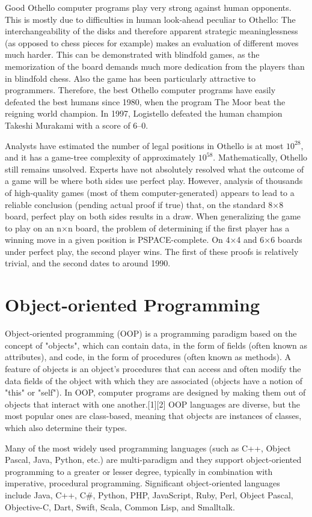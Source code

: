 \documentclass[a4paper]{report}
\begin{document}
Good Othello computer programs play very strong against human opponents. This is mostly due to difficulties in human look-ahead peculiar to Othello: The interchangeability of the disks and therefore apparent strategic meaninglessness (as opposed to chess pieces for example) makes an evaluation of different moves much harder. This can be demonstrated with blindfold games, as the memorization of the board demands much more dedication from the players than in blindfold chess. Also the game has been particularly attractive to programmers. Therefore, the best Othello computer programs have easily defeated the best humans since 1980, when the program The Moor beat the reigning world champion. In 1997, Logistello defeated the human champion Takeshi Murakami with a score of 6–0. 
\par
Analysts have estimated the number of legal positions in Othello is at most $10^28$, and it has a game-tree complexity of approximately $10^58$. Mathematically, Othello still remains unsolved. Experts have not absolutely resolved what the outcome of a game will be where both sides use perfect play. However, analysis of thousands of high-quality games (most of them computer-generated) appears to lead to a reliable conclusion (pending actual proof if true) that, on the standard 8×8 board, perfect play on both sides results in a draw. When generalizing the game to play on an n×n board, the problem of determining if the first player has a winning move in a given position is PSPACE-complete. On 4×4 and 6×6 boards under perfect play, the second player wins. The first of these proofs is relatively trivial, and the second dates to around 1990. 

\section{Object-oriented Programming}
Object-oriented programming (OOP) is a programming paradigm based on the concept of "objects", which can contain data, in the form of fields (often known as attributes), and code, in the form of procedures (often known as methods). A feature of objects is an object's procedures that can access and often modify the data fields of the object with which they are associated (objects have a notion of "this" or "self"). In OOP, computer programs are designed by making them out of objects that interact with one another.[1][2] OOP languages are diverse, but the most popular ones are class-based, meaning that objects are instances of classes, which also determine their types. 
\par
Many of the most widely used programming languages (such as C++, Object Pascal, Java, Python, etc.) are multi-paradigm and they support object-oriented programming to a greater or lesser degree, typically in combination with imperative, procedural programming. Significant object-oriented languages include Java, C++, C\#, Python, PHP, JavaScript, Ruby, Perl, Object Pascal, Objective-C, Dart, Swift, Scala, Common Lisp, and Smalltalk. 
\end{document}
